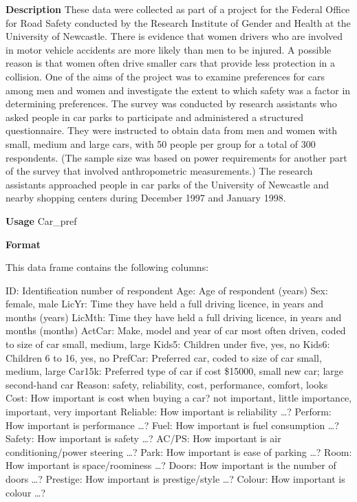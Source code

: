 \documentclass[]{book}
\begin{document}
\textbf{Description}
These data were collected as part of a project for the Federal Office for Road Safety conducted by the Research Institute of Gender and Health at the University of Newcastle. There is evidence that women drivers who are involved in motor vehicle accidents are more likely than men to be injured. A possible reason is that women often drive smaller cars that provide less protection in a collision. One of the aims of the project was to examine preferences for cars among men and women and investigate the extent to which safety was a factor in determining preferences.
The survey was conducted by research assistants who asked people in car parks to participate and administered a structured questionnaire. They were instructed to obtain data from men and women with small, medium and large cars, with 50 people per group for a total of 300 respondents. (The sample size was based on power requirements for another part of the survey that involved anthropometric measurements.) The research assistants approached people in car parks of the University of Newcastle and nearby shopping centers during December 1997 and January 1998.

\textbf{Usage}
Car\_pref

\textbf{Format}

This data frame contains the following columns:

ID: Identification number of respondent
Age: Age of respondent (years)
Sex: female, male
LicYr: Time they have held a full driving licence, in years and months (years)
LicMth: Time they have held a full driving licence, in years and months (months)
ActCar: Make, model and year of car most often driven, coded to size of car small, medium, large
Kids5: Children under five, yes, no
Kids6: Children 6 to 16, yes, no
PrefCar: Preferred car, coded to size of car small, medium, large
Car15k: Preferred type of car if cost \$15000, small new car; large second-hand car
Reason: safety, reliability, cost, performance, comfort, looks
Cost: How important is cost when buying a car? not important, little importance, important, very important
Reliable: How important is reliability \ldots{}?
Perform: How important is performance \ldots{}?
Fuel: How important is fuel consumption \ldots{}?
Safety: How important is safety \ldots{}?
AC/PS: How important is air conditioning/power steering \ldots{}?
Park: How important is ease of parking \ldots{}?
Room: How important is space/roominess \ldots{}?
Doors: How important is the number of doors \ldots{}?
Prestige: How important is prestige/style \ldots{}?
Colour: How important is colour \ldots{}?
\end{document}
